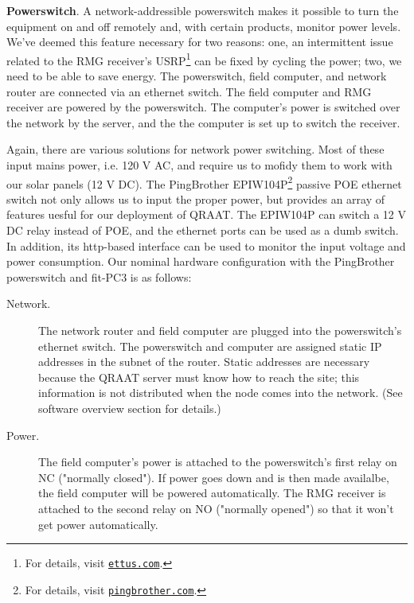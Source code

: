 \documentclass[letter]{article}
\newcounter{foot}
\begin{document}
\textbf{Powerswitch}. A network-addressible powerswitch makes it possible to turn the 
equipment on and off remotely and, with certain products, monitor power levels. We've 
deemed this feature necessary for two reasons: one, an intermittent issue related to 
the RMG receiver's USRP\footnote{For details, visit
\href{https://www.ettus.com}{\tt ettus.com}.} can be fixed by 
cycling the power; two, we need to be able to save energy. The powerswitch, field computer,
and network router are connected via an ethernet switch. The field computer and RMG 
receiver are powered by the powerswitch. The computer's power is switched over the 
network by the server, and the the computer is set up to switch the receiver. 

Again, there are various solutions for network power switching. Most of these input 
mains power, i.e. 120 V AC, and require us to mofidy them to work with our solar 
panels (12 V DC). The PingBrother EPIW104P\footnote{For details, visit
\href{http://www.pingbrother.com}{\tt pingbrother.com}.} passive POE ethernet switch 
not only allows us to input the proper power, but provides an array of features 
uesful for our deployment of QRAAT. The EPIW104P can switch a 12 V DC relay instead of
POE, and the ethernet ports can be used as a dumb switch. In addition, its http-based 
interface can be used to monitor the input voltage and power consumption. Our nominal 
hardware configuration with the PingBrother powerswitch and fit-PC3 is as follows: 

\begin{description}
  \item[\quad Network.] The network router and field computer are plugged into the 
    powerswitch's ethernet switch. The powerswitch and computer are assigned static
    IP addresses in the subnet of the router. Static addresses are necessary because 
    the QRAAT server must know how to reach the site; this information is not 
    distributed when the node comes into the network. (See software overview section 
    for details.) 
    
  \item[\quad Power.] The field computer's power is attached to the powerswitch's 
    first relay on NC ("normally closed"). If power goes down and is then made 
    availalbe, the field computer will be powered automatically. The RMG receiver is
    attached to the second relay on NO ("normally opened") so that it won't get power 
    automatically. 
    
\end{description}
 
\end{document}
